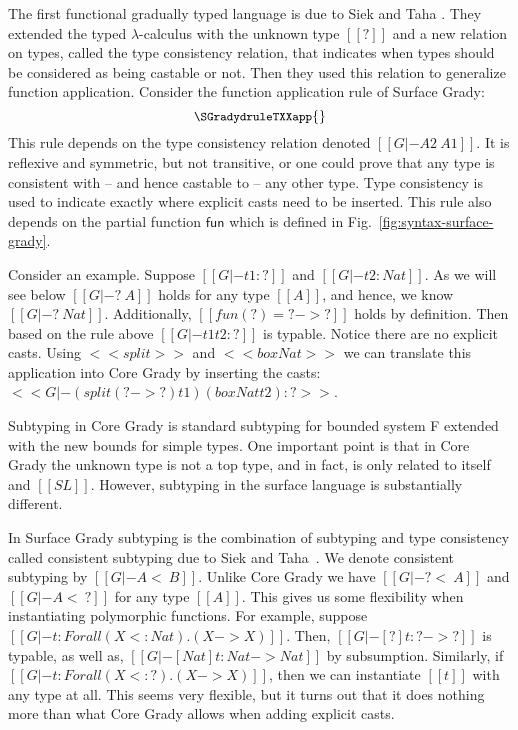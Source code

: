 The first functional gradually typed language is due to Siek and Taha
\cite{Siek:2006}. They extended the typed $\lambda$-calculus with the
unknown type $[[?]]$ and a new relation on types, called the type
consistency relation, that indicates when types should be considered
as being castable or not.  Then they used this relation to generalize
function application.  Consider the function application rule of
Surface Grady:
\[\small
\SGradydruleTXXapp{}
\]
This rule depends on the type consistency relation denoted $[[G |- A2
    ~ A1]]$.  It is reflexive and symmetric, but not transitive, or
one could prove that any type is consistent with -- and hence castable
to -- any other type.  Type consistency is used to indicate exactly
where explicit casts need to be inserted.  This rule also depends on
the partial function $\mathsf{fun}$ which is defined in
Fig.~\ref{fig:syntax-surface-grady}.

Consider an example.  Suppose $[[G |- t1 : ?]]$ and $[[G |- t2 :
    Nat]]$.  As we will see below $[[G |- ? ~ A]]$ holds for any type
$[[A]]$, and hence, we know $[[G |- ? ~ Nat]]$. Additionally,
$[[fun(?) = ? -> ?]]$ holds by definition.  Then based on the rule
above $[[G |- t1 t2 : ?]]$ is typable.  Notice there are no explicit
casts.  Using $<<split>>$ and $<<box Nat>>$ we can translate this
application into Core Grady by inserting the casts:
$<<G |- (split (? -> ?) t1) (box Nat t2) : ?>>$.

Subtyping in Core Grady is standard subtyping for bounded system F
extended with the new bounds for simple types.  One important point is
that in Core Grady the unknown type is not a top type, and in fact, is
only related to itself and $[[SL]]$.  However, subtyping in the
surface language is substantially different.

In Surface Grady subtyping is the combination of subtyping and type
consistency called consistent subtyping due to
Siek and Taha~\cite{Siek:2007}.  We denote consistent subtyping by $[[G |-
    A <~ B]]$.  Unlike Core Grady we have $[[G |- ? <~ A]]$ and $[[G
    |- A <~ ?]]$ for any type $[[A]]$.  This gives us some flexibility
when instantiating polymorphic functions.  For example, suppose $[[G
    |- t : Forall (X <: Nat).(X -> X)]]$.  Then, $[[G |- [?]t : ? ->
    ?]]$ is typable, as well as, $[[G |- [Nat]t : Nat -> Nat]]$ by
subsumption.  Similarly, if $[[G |- t : Forall (X <: ?).(X -> X)]]$,
then we can instantiate $[[t]]$ with any type at all.  This seems very
flexible, but it turns out that it does nothing more than what Core
Grady allows when adding explicit casts.

